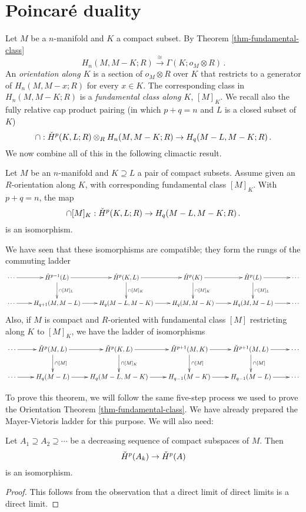 \section{Poincar\'{e} duality}

Let  $M$ be a $n$-manifold and $K$ a compact subset. 
By Theorem \ref{thm-fundamental-class}
\[
H_n(M,M-K;R)\xrightarrow{\cong}\Gamma(K;o_M\otimes R)\,.
\]
An {\em orientation along $K$} is a section of $o_M\otimes R$ over $K$ that 
restricts to a generator 
of $H_n(M,M-x;R)$ for every $x\in K$. The corresponding class in 
$H_n(M,M-K;R)$ is a
{\em fundamental class along $K$}, $[M]_K$. 
We recall also the fully relative cap product pairing (in which $p+q=n$
and $L$ is a closed subset of $K$)
\[
\cap:\check{H}^p(K,L;R)\otimes_R H_n(M,M-K;R)\to H_q(M-L,M-K;R)\,.
\]
We now combine all of this in the following climactic result.
\begin{theorem}
\label{thm-big-poincare}
Let $M$ be an $n$-manifold and $K\supseteq L$ a pair of 
compact subsets. Assume given an $R$-orientation along $K$, 
with corresponding fundamental class $[M]_K$. With $p+q=n$, the map
\[
\cap[M]_K:\check{H}^p(K,L;R)\to H_q(M-L,M-K;R)\,.
\]
is an isomorphism.
\end{theorem}
We have seen that these isomorphisms are compatible; they form the 
rungs of the commuting ladder
\[
\xymatrix{
\cdots \ar[r] & 
\cHH^{p-1}(L) \ar[r] \ar[d]^{\cap[M]_L} &
\cHH^p(K,L) \ar[r] \ar[d]^{\cap[M]_K} &
\cHH^p(K) \ar[r] \ar[d]^{\cap[M]_K} &
\cHH^p(L) \ar[r] \ar[d]^{\cap[M]_L} & \cdots \\
\cdots \ar[r] & H_{q+1}(M,M-L) \ar[r] & 
H_q(M-L,M-K) \ar[r] & H_q(M,M-K) \ar[r] &
H_q(M,M-L) \ar[r] & \cdots 
}\]
Also, if $M$ is compact and $R$-oriented with fundamental class $[M]$ 
restricting along $K$ to $[M]_K$, we have the ladder of isomorphisms
\[
\xymatrix{
\cdots \ar[r] & \cHH^p(M,L) \ar[r] \ar[d]^{\cap[M]} &
\cHH^p(K,L) \ar[r] \ar[d]^{\cap[M]_K} &
\cHH^{p+1}(M,K) \ar[r] \ar[d]^{\cap[M]} & 
\cHH^{p+1}(M,L) \ar[r] \ar[d]^{\cap[M]} & \cdots \\
\cdots \ar[r] & H_q(M-L) \ar[r] & 
H_q(M-L,M-K) \ar[r] & H_{q-1}(M-K) \ar[r] & 
H_{q-1}(M-L) \ar[r] & \cdots
}\]

To prove this theorem, 
we will follow the same five-step process we used to prove the Orientation
Theorem \ref{thm-fundamental-class}. We have already prepared the
Mayer-Vietoris ladder for this purpose. We will also need:

\begin{lemma}
\label{lem-cech-limit}
Let $A_1\supseteq A_2\supseteq \cdots$ be a decreasing sequence of 
compact subspaces of $M$. Then 
\[
\check{H}^p(A_k)\to\check{H}^p(A)
\]
is an isomorphism. 
\end{lemma}
\begin{proof}
This follows from the observation that 
a direct limit of direct limits is a direct limit.
\end{proof}


